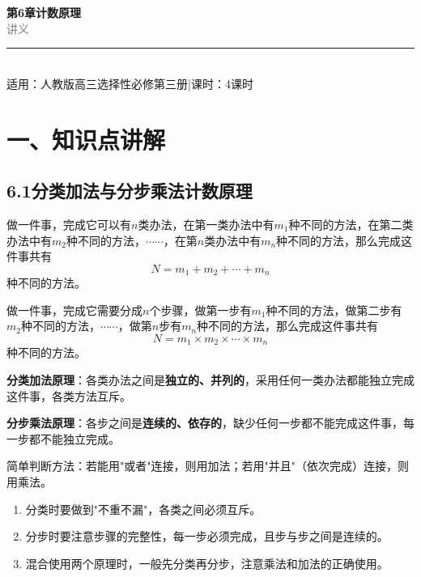 \documentclass[12pt, a4paper]{ctexart}
\begin{document}
\begin{center}
{\Huge\bfseries\textcolor{mainblue}{第6章\quad 计数原理}}\\[12pt]
{\Large\textcolor{gray}{讲\quad 义}}\\[8pt]
\rule{0.6\textwidth}{1pt}\\[8pt]
{\normalsize 适用：人教版\quad 高三选择性必修第三册\quad |\quad 课时：4课时}
\end{center}
\vspace{10pt}

\section*{\textcolor{mainblue}{一、知识点讲解}}

\subsection*{6.1\quad 分类加法与分步乘法计数原理}

\begin{knowledgebox}[分类加法计数原理]
做一件事，完成它可以有$n$类办法，在第一类办法中有$m_1$种不同的方法，在第二类办法中有$m_2$种不同的方法，$\cdots\cdots$，在第$n$类办法中有$m_n$种不同的方法，那么完成这件事共有
\[
N = m_1 + m_2 + \cdots + m_n
\]
种不同的方法。
\end{knowledgebox}

\begin{knowledgebox}[分步乘法计数原理]
做一件事，完成它需要分成$n$个步骤，做第一步有$m_1$种不同的方法，做第二步有$m_2$种不同的方法，$\cdots\cdots$，做第$n$步有$m_n$种不同的方法，那么完成这件事共有
\[
N = m_1 \times m_2 \times \cdots \times m_n
\]
种不同的方法。
\end{knowledgebox}

\begin{tipbox}[两个原理的区别]
\textbf{分类加法原理}：各类办法之间是\textbf{独立的、并列的}，采用任何一类办法都能独立完成这件事，各类方法互斥。

\textbf{分步乘法原理}：各步之间是\textbf{连续的、依存的}，缺少任何一步都不能完成这件事，每一步都不能独立完成。

简单判断方法：若能用"或者"连接，则用加法；若用"并且"（依次完成）连接，则用乘法。
\end{tipbox}

\begin{warnbox}[易错提醒]
\begin{enumerate}[label=\arabic*.]
  \item 分类时要做到"不重不漏"，各类之间必须互斥。
  \item 分步时要注意步骤的完整性，每一步必须完成，且步与步之间是连续的。
  \item 混合使用两个原理时，一般先分类再分步，注意乘法和加法的正确使用。
\end{enumerate}
\end{warnbox}
\end{document}
